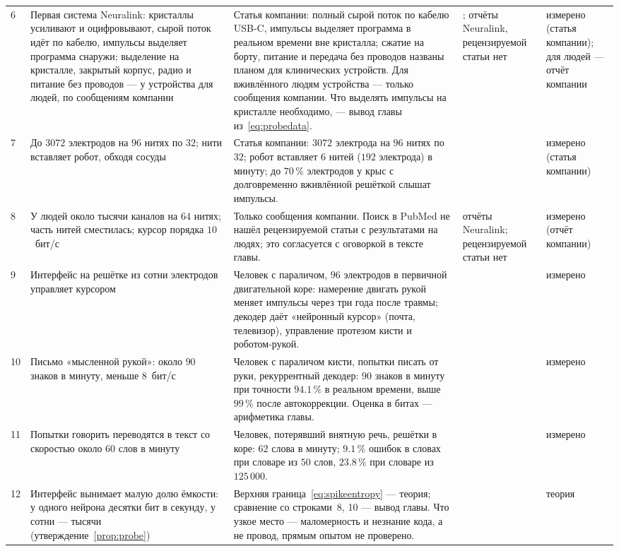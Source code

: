 {\begin{longtable}{>{\raggedright}p{0.5cm}>{\raggedright}p{4.0cm}>{\raggedright}p{5.6cm}>{\raggedright}p{2.3cm}>{\raggedright\arraybackslash}p{1.7cm}}
6 & Первая система Neuralink: кристаллы усиливают и оцифровывают, сырой поток идёт по кабелю, импульсы выделяет программа снаружи; выделение на кристалле, закрытый корпус, радио и питание без проводов --- у устройства для людей, по сообщениям компании & Статья компании: полный сырой поток по кабелю USB-C, импульсы выделяет программа в реальном времени вне кристалла; сжатие на борту, питание и передача без проводов названы планом для клинических устройств. Для вживлённого людям устройства --- только сообщения компании. Что выделять импульсы на кристалле необходимо, --- вывод главы из~\eqref{eq:probedata}. & \cite{Musk2019}; отчёты Neuralink, рецензируемой статьи нет & измерено (статья компании); для людей --- отчёт компании \\
7 & До $3072$ электродов на $96$ нитях по $32$; нити вставляет робот, обходя сосуды & Статья компании: $3072$ электрода на $96$ нитях по $32$; робот вставляет $6$ нитей ($192$ электрода) в минуту; до $70\,\%$ электродов у крыс с долговременно вживлённой решёткой слышат импульсы. & \cite{Musk2019} & измерено (статья компании) \\
8 & У людей около тысячи каналов на $64$ нитях; часть нитей сместилась; курсор порядка $10$~бит/с & Только сообщения компании. Поиск в PubMed не нашёл рецензируемой статьи с результатами на людях; это согласуется с оговоркой в тексте главы. & отчёты Neuralink; рецензируемой статьи нет & измерено (отчёт компании) \\
9 & Интерфейс на решётке из сотни электродов управляет курсором & Человек с параличом, $96$ электродов в первичной двигательной коре: намерение двигать рукой меняет импульсы через три года после травмы; декодер даёт «нейронный курсор» (почта, телевизор), управление протезом кисти и роботом-рукой. & \cite{Hochberg2006} & измерено \\
10 & Письмо «мысленной рукой»: около $90$ знаков в минуту, меньше $8$~бит/с & Человек с параличом кисти, попытки писать от руки, рекуррентный декодер: $90$ знаков в минуту при точности $94.1\,\%$ в реальном времени, выше $99\,\%$ после автокоррекции. Оценка в битах --- арифметика главы. & \cite{Willett2021} & измерено \\
11 & Попытки говорить переводятся в текст со скоростью около $60$ слов в минуту & Человек, потерявший внятную речь, решётки в коре: $62$ слова в минуту; $9.1\,\%$ ошибок в словах при словаре из $50$ слов, $23.8\,\%$ при словаре из $125\,000$. & \cite{Willett2023} & измерено \\
12 & Интерфейс вынимает малую долю ёмкости: у одного нейрона десятки бит в секунду, у сотни --- тысячи (утверждение~\ref{prop:probe}) & Верхняя граница~\eqref{eq:spikeentropy} --- теория; сравнение со строками~8, 10 --- вывод главы. Что узкое место --- маломерность и незнание кода, а не провод, прямым опытом не проверено. & \cite{Rieke1997} & теория \\

\end{longtable}}
